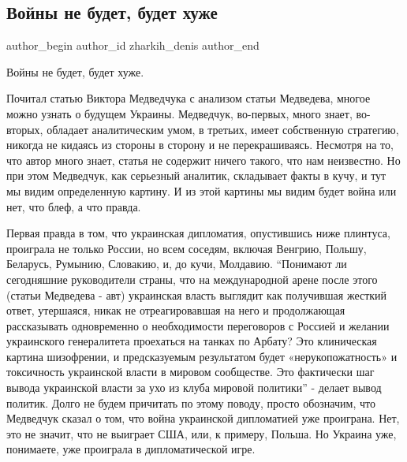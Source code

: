  
 
 
 
 
 
\subsection{Войны не будет, будет хуже}
\label{sec:06_12_2021.fb.zharkih_denis.1.vojny_ne_budet_huzhe}
 
\ifcmt
 author_begin
   author_id zharkih_denis
 author_end
\fi

Войны не будет, будет хуже. 

Почитал статью Виктора Медведчука с анализом статьи Медведева, многое можно
узнать о будущем Украины. Медведчук, во-первых, много знает, во-вторых,
обладает аналитическим умом, в третьих, имеет собственную стратегию, никогда не
кидаясь из стороны в сторону и не перекрашиваясь. Несмотря на то, что автор
много знает, статья не содержит ничего такого, что нам неизвестно. Но при этом
Медведчук, как серьезный аналитик, складывает факты в кучу, и тут мы видим
определенную картину. И из этой картины мы видим будет война или нет, что блеф,
а что правда. 

Первая правда в том, что украинская дипломатия, опустившись ниже плинтуса,
проиграла не только России, но всем соседям, включая Венгрию, Польшу, Беларусь,
Румынию, Словакию, и, до кучи, Молдавию.  \enquote{Понимают ли сегодняшние руководители
страны, что на международной арене после этого (статьи Медведева - авт)
украинская власть выглядит как получившая жесткий ответ, утершаяся, никак не
отреагировавшая на него и продолжающая рассказывать одновременно о
необходимости переговоров с Россией и желании украинского генералитета
проехаться на танках по Арбату? Это клиническая картина шизофрении, и
предсказуемым результатом будет «нерукопожатность» и токсичность украинской
власти в мировом сообществе. Это фактически шаг вывода украинской власти за ухо
из клуба мировой политики} - делает вывод политик. Долго не будем причитать по
этому поводу, просто обозначим, что Медведчук сказал о том, что война
украинской дипломатией уже проиграна. Нет, это не значит, что не выиграет США,
или, к примеру, Польша. Но Украина уже, понимаете, уже проиграла в
дипломатической игре. 

